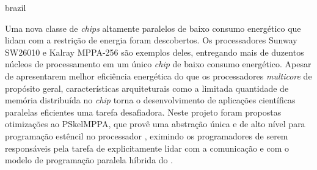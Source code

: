 \swapcontents
{
    \begin{otherlanguage*}{brazil}
    \begin{resumo}[Resumo]

        Uma nova classe de \textit{chips} altamente paralelos de baixo consumo energético que lidam com a restrição de energia foram descobertos. Os processadores Sunway SW26010 e Kalray MPPA-256 são exemplos deles, entregando mais de duzentos núcleos de processamento em um único \textit{chip} de baixo consumo energético. Apesar de apresentarem melhor eficiência energética do que os processadores \textit{multicore} de propósito geral, características arquiteturais como a limitada quantidade de memória distribuída no \textit{chip} torna o desenvolvimento de aplicações científicas paralelas eficientes uma tarefa desafiadora. Neste projeto foram propostas otimizações ao \fw PSkelMPPA, que provê uma abstração única e de alto nível para programação estêncil no processador \mppa, eximindo os programadores de serem responsáveis pela tarefa de explicitamente lidar com a comunicação e com o modelo de programação paralela híbrida do \mppa.


    \end{resumo}
    \end{otherlanguage*}
}

